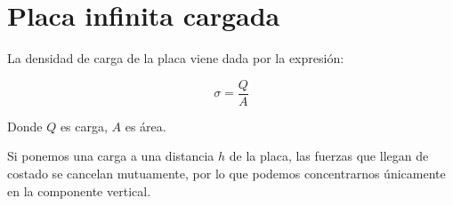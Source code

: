 \section{Placa infinita cargada}

La densidad de carga de la placa viene dada por la expresión:

\vspace{.5cm}
\begin{equation*}
    \sigma = \frac{Q}{A}
\end{equation*}
\vspace{.5cm}

Donde \(Q\) es carga,
\(A\) es área.

Si ponemos una carga a una distancia \(h\) de la placa,
las fuerzas que llegan de costado se cancelan mutuamente,
por lo que podemos concentrarnos únicamente en la componente vertical.